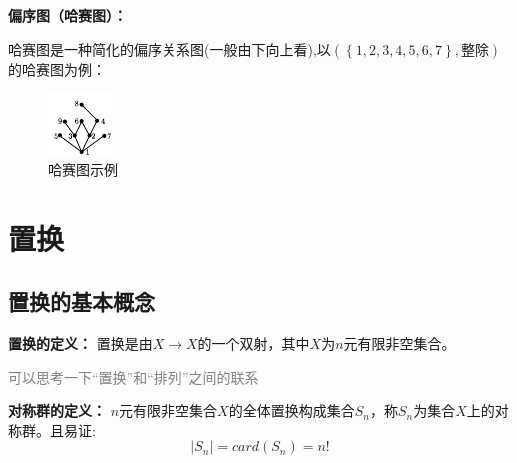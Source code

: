 \documentclass[zihao=-4,UTF8]{report}
\begin{document}
\textbf{偏序图（哈赛图）：}\par
哈赛图是一种简化的偏序关系图(一般由下向上看),以$(\left \{ 1,2,3,4,5,6,7 \right \},\text{整除} )$的哈赛图为例：
\begin{figure}[H]
    \centering
    \includegraphics[scale=4]{../pic/位图.pdf}
    \caption{哈赛图示例}
\end{figure}

\section{置换}

\subsection{置换的基本概念}

\textbf{置换的定义：}
置换是由$X\longrightarrow X$的一个双射，其中$X$为$n$元有限非空集合。\par
\textcolor{gray}{可以思考一下“置换”和“排列”之间的联系}

\textbf{对称群的定义：}
$n$元有限非空集合$X$的全体置换构成集合$S_{n}$，称$S_{n}$为集合$X$上的对称群。且易证:
\begin{equation*}
    \left | S_{n} \right | =card(S_{n})=n!
\end{equation*}
\end{document}
